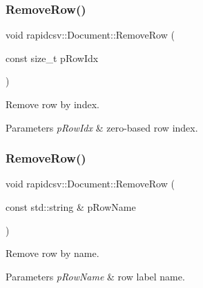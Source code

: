 \subsubsection{\texorpdfstring{Remove\+Row()}{RemoveRow()}\hspace{0.1cm}{\footnotesize\ttfamily [1/2]}}
{\footnotesize\ttfamily void rapidcsv\+::\+Document\+::\+Remove\+Row (\begin{DoxyParamCaption}\item[{const size\+\_\+t}]{p\+Row\+Idx }\end{DoxyParamCaption})\hspace{0.3cm}{\ttfamily [inline]}}



Remove row by index. 


\begin{DoxyParams}{Parameters}
{\em p\+Row\+Idx} & zero-\/based row index. \\
\hline
\end{DoxyParams}
\mbox{\label{classrapidcsv_1_1Document_a43504afd4fc6e2912e0d004bc841425b}} 
\subsubsection{\texorpdfstring{Remove\+Row()}{RemoveRow()}\hspace{0.1cm}{\footnotesize\ttfamily [2/2]}}
{\footnotesize\ttfamily void rapidcsv\+::\+Document\+::\+Remove\+Row (\begin{DoxyParamCaption}\item[{const std\+::string \&}]{p\+Row\+Name }\end{DoxyParamCaption})\hspace{0.3cm}{\ttfamily [inline]}}



Remove row by name. 


\begin{DoxyParams}{Parameters}
{\em p\+Row\+Name} & row label name. \\
\hline
\end{DoxyParams}
\mbox{\label{classrapidcsv_1_1Document_a9a20f5cb294ac8e28d312dc3665957fe}} 
